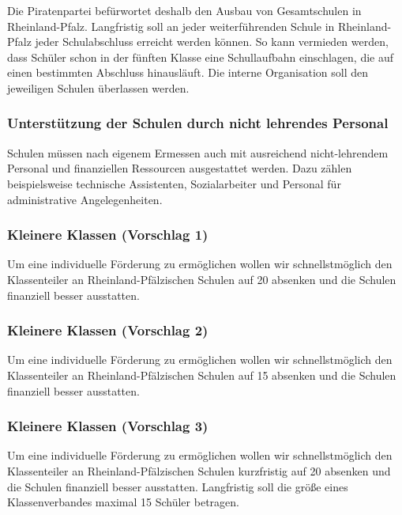 Die Piratenpartei befürwortet deshalb den Ausbau von Gesamtschulen in Rheinland-Pfalz. Langfristig soll an jeder weiterführenden Schule in Rheinland-Pfalz jeder Schulabschluss erreicht werden können. So kann vermieden werden, dass Schüler schon in der fünften Klasse eine Schullaufbahn einschlagen, die auf einen bestimmten Abschluss hinausläuft. Die interne Organisation soll den jeweiligen Schulen überlassen werden.


\subsubsection{Unterstützung der Schulen durch nicht lehrendes Personal}
\abstimmung
Schulen müssen nach eigenem Ermessen auch mit ausreichend nicht-lehrendem Personal und finanziellen Ressourcen ausgestattet werden. Dazu zählen beispielsweise technische Assistenten, Sozialarbeiter und Personal für administrative Angelegenheiten.
 

\subsubsection{Kleinere Klassen (Vorschlag 1)}
\abstimmung
Um eine individuelle Förderung zu ermöglichen wollen wir schnellstmöglich den Klassenteiler an Rheinland-Pfälzischen Schulen auf 20 absenken und die Schulen finanziell besser ausstatten.

\subsubsection{Kleinere Klassen (Vorschlag 2)}
\abstimmung
Um eine individuelle Förderung zu ermöglichen wollen wir schnellstmöglich den Klassenteiler an Rheinland-Pfälzischen Schulen auf 15 absenken und die Schulen finanziell besser ausstatten.

\subsubsection{Kleinere Klassen (Vorschlag 3)}
\abstimmung
Um eine individuelle Förderung zu ermöglichen wollen wir schnellstmöglich den Klassenteiler an Rheinland-Pfälzischen Schulen kurzfristig auf 20 absenken und die Schulen finanziell besser ausstatten. Langfristig soll die größe eines Klassenverbandes maximal 15 Schüler betragen.
 
